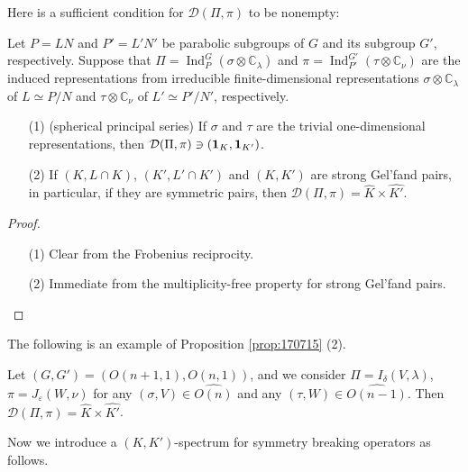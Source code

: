 Here is a sufficient condition for ${\mathcal{D}}(\Pi,\pi)$ 
 to be nonempty:
\begin{proposition}
\label{prop:170715}
Let $P=L N$
 and $P'=L' N'$ be parabolic subgroups of $G$ and its subgroup $G'$, 
 respectively.  
Suppose that $\Pi={\operatorname{Ind}}_P^G(\sigma \otimes {\mathbb{C}}_{\lambda})$
 and $\pi={\operatorname{Ind}}_{P'}^{G'}(\tau \otimes {\mathbb{C}}_{\nu})$
 are the induced representations from irreducible
 finite-dimensional representations
 $\sigma \otimes {\mathbb{C}}_{\lambda}$ of $L \simeq P/N$
 and $\tau \otimes {\mathbb{C}}_{\nu}$ of $L' \simeq P'/N'$, 
 respectively.  
\begin{enumerate}
\item[{\rm{(1)}}]
{\rm{(spherical principal series)}}\enspace
If $\sigma$ and $\tau$ are the trivial one-dimensional representations, 
then ${\mathcal{D}}(\Pi,\pi) \ni ({\bf{1}}_K, {\bf{1}}_{K'})$.  
\item[{\rm{(2)}}]
If $(K, L \cap K)$, $(K', L' \cap K')$ and $(K, K')$ are strong Gel'fand pairs, 
 in particular,
 if they are symmetric pairs, 
 then ${\mathcal{D}}(\Pi,\pi) = \widehat K \times \widehat {K'}$.  
\end{enumerate}
\end{proposition}
\begin{proof}
\begin{enumerate}
\item[(1)]
Clear from the Frobenius reciprocity.  
\item[(2)]
Immediate from the multiplicity-free property for strong Gel'fand pairs.  
\end{enumerate}
\end{proof}
The following is an example of Proposition \ref{prop:170715} (2).  
\begin{example}
\label{ex:5.2}
Let $(G,G')=(O(n+1,1),O(n,1))$, 
 and we consider $\Pi= I_{\delta}(V,\lambda)$, 
$\pi=J_{\varepsilon}(W, \nu)$
 for any $(\sigma, V) \in \widehat {O(n)}$
 and any $(\tau, W) \in \widehat {O(n-1)}$.  
Then ${\mathcal{D}}(\Pi,\pi)= \widehat K \times \widehat{K'}$.  
\end{example}

Now we introduce a $(K,K')$-spectrum
 for symmetry breaking operators as follows.  

